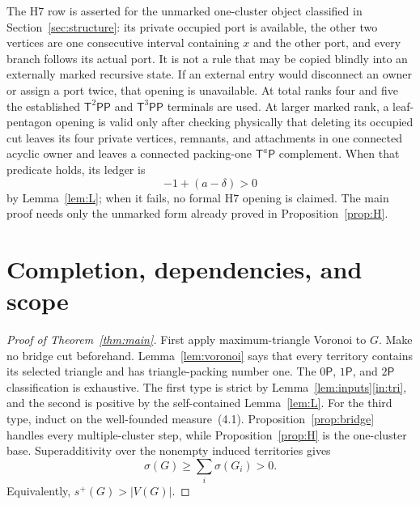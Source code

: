 \documentclass[11pt]{article}
\theoremstyle{remark}
\newcommand{\splus}{s^+}
\newcommand{\sig}{\sigma}
\newcommand{\T}{\mathsf T}
\newcommand{\Pp}{\mathsf P}
\begin{document}
The H7 row is asserted for the unmarked one-cluster object classified in
Section~\ref{sec:structure}: its private occupied port is available, the other
two vertices are one consecutive interval containing $x$ and the other port,
and every branch follows its actual port.  It is not a rule that may be copied
blindly into an externally marked recursive state.  If an external entry would
disconnect an owner or assign a port twice, that opening is unavailable.  At
total ranks four and five the established $\T^2\Pp\Pp$ and
$\T^3\Pp\Pp$ terminals are used.  At larger marked rank, a leaf-pentagon
opening is valid only after checking physically that deleting its occupied cut
leaves its four private vertices, remnants, and attachments in one connected
acyclic owner and leaves a connected packing-one $\T^a\Pp$ complement.  When
that predicate holds, its ledger is
\[
 -1+(a-\delta)>0
\]
by Lemma~\ref{lem:L}; when it fails, no formal H7 opening is claimed.  The main
proof needs only the unmarked form already proved in Proposition~\ref{prop:H}.

\section{Completion, dependencies, and scope}\label{sec:dependencies}

\begin{proof}[Proof of Theorem~\ref{thm:main}]
First apply maximum-triangle Voronoi to $G$.  Make no bridge cut beforehand.
Lemma~\ref{lem:voronoi} says that every territory contains its selected
triangle and has triangle-packing number one.  The $0\Pp$, $1\Pp$, and
$2\Pp$ classification is exhaustive.  The first type is strict by
Lemma~\ref{lem:inputs}\ref{in:tri}, and the second is positive by the
self-contained Lemma~\ref{lem:L}.  For the third type, induct on the
well-founded measure~(4.1).  Proposition~\ref{prop:bridge} handles every
multiple-cluster step, while Proposition~\ref{prop:H} is the one-cluster base.
Superadditivity over the nonempty induced territories gives
\[
 \sig(G)\geq\sum_i\sig(G_i)>0.
\]
Equivalently, $\splus(G)>|V(G)|$.
\end{proof}
\end{document}
